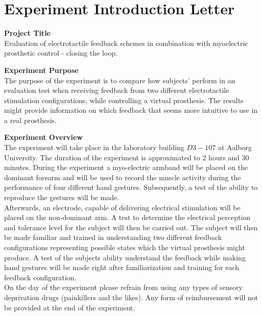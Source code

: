 \newpage
\section{Experiment Introduction Letter}

\textbf{Project Title} \\
Evaluation of electrotactile feedback schemes in combination with myoelectric prosthetic control - closing the loop. 

\textbf{Experiment Purpose} \\
The purpose of the experiment is to compare how subjects' perform in an evaluation test when receiving feedback from two different electrotactile stimulation configurations, while controlling a virtual prosthesis. The results might provide information on which feedback that seems more intuitive to use in a real prosthesis.   

\textbf{Experiment Overview} \\
The experiment will take place in the laboratory building $D3-107$ at Aalborg University. The duration of the experiment is approximated to 2 hours and 30 minutes. During the experiment a myo-electric armband will be placed on the dominant forearm and will be used to record the muscle activity during the performance of four different  hand gestures. Subsequently, a test of the ability to reproduce the gestures will be made. \\
Afterwards, an electrode, capable of delivering electrical stimulation will be placed on the non-dominant arm. A test to determine the electrical perception and tolerance level for the subject will then be carried out. The subject will then be made familiar and trained in understanding two different feedback configurations representing possible states which the virtual prosthesis might produce. A test of the subjects ability understand the feedback while making hand gestures will be made right after familiarization and training for each feedback configuration. \\
On the day of the experiment please refrain from using any types of sensory deprivation drugs (painkillers and the likes). Any form of reimbursement will not be provided at the end of the experiment.   
